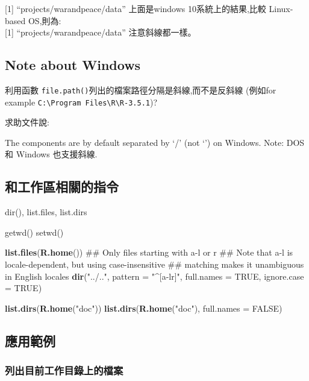 \documentclass[]{book}
\newenvironment{Shaded}{\begin{snugshade}}{\end{snugshade}}
\newcommand{\KeywordTok}[1]{\textcolor[rgb]{0.13,0.29,0.53}{\textbf{#1}}}
\newcommand{\DataTypeTok}[1]{\textcolor[rgb]{0.13,0.29,0.53}{#1}}
\newcommand{\StringTok}[1]{\textcolor[rgb]{0.31,0.60,0.02}{#1}}
\newcommand{\OtherTok}[1]{\textcolor[rgb]{0.56,0.35,0.01}{#1}}
\newcommand{\NormalTok}[1]{#1}
\theoremstyle{definition}
\theoremstyle{definition}
\theoremstyle{definition}
\theoremstyle{remark}
\begin{document}
{[}1{]} ``projects/warandpeace/data'' 上面是windows 10系統上的結果,比較
Linux-based OS,則為:\\
{[}1{]} ``projects/warandpeace/data'' 注意斜線都一樣。

\subsection{Note about Windows}\label{note-about-windows}

利用函數 \texttt{file.path()}列出的檔案路徑分隔是斜線,而不是反斜線
(例如for example
\texttt{C:\textbackslash{}Program\ Files\textbackslash{}R\textbackslash{}R-3.5.1})?

求助文件說:

The components are by default separated by `/' (not `') on Windows.
Note: DOS 和 Windows 也支援斜線.

\subsection{和工作區相關的指令}

dir(), list.files, list.dirs

getwd() setwd()

\begin{Shaded}
\begin{Highlighting}[]
\KeywordTok{list.files}\NormalTok{(}\KeywordTok{R.home}\NormalTok{())}
\NormalTok{## Only files starting with a-l or r}
\NormalTok{## Note that a-l is locale-dependent, but using case-insensitive}
\NormalTok{## matching makes it unambiguous in English locales}
\KeywordTok{dir}\NormalTok{(}\StringTok{"../.."}\NormalTok{, }\DataTypeTok{pattern =} \StringTok{"^[a-lr]"}\NormalTok{, }\DataTypeTok{full.names =} \OtherTok{TRUE}\NormalTok{, }\DataTypeTok{ignore.case =} \OtherTok{TRUE}\NormalTok{)}

\KeywordTok{list.dirs}\NormalTok{(}\KeywordTok{R.home}\NormalTok{(}\StringTok{"doc"}\NormalTok{))}
\KeywordTok{list.dirs}\NormalTok{(}\KeywordTok{R.home}\NormalTok{(}\StringTok{"doc"}\NormalTok{), }\DataTypeTok{full.names =} \OtherTok{FALSE}\NormalTok{)}
\end{Highlighting}
\end{Shaded}

\subsection{應用範例}

\subsubsection{列出目前工作目錄上的檔案}
\end{document}
